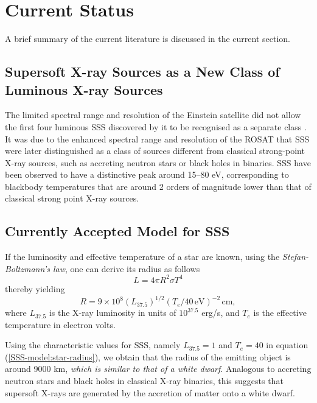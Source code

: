     \section{Current Status} \label{introduction:current_status}
        A brief summary of the current literature is discussed in the current section.
        
        \subsection{Supersoft X-ray Sources as a New Class of Luminous X-ray Sources} \label{introduction:current_status:new-class}
        	The limited spectral range and resolution of the Einstein satellite did not allow the first four luminous SSS discovered by it to be recognised as a separate class \cite{long81,seward81}. It was due to the enhanced spectral range and resolution of the ROSAT that SSS were later distinguished as a class of sources different from classical strong-point X-ray sources, such as accreting neutron stars or black holes in binaries. SSS have been observed to have a distinctive peak around 15--80 eV, corresponding to blackbody temperatures that are around 2 orders of magnitude lower than that of classical strong point X-ray sources.
        	
        \subsection{Currently Accepted Model for SSS} \label{introduction:current_status:SSS-model}
        	If the luminosity and effective temperature of a star are known, using the \emph{Stefan-Boltzmann's law}, one can derive its radius as follows
        	\begin{equation} \label{SSS-model:stef-boltz}
        		L=4\pi R^2\sigma T^4
        	\end{equation}
        	thereby yielding
        	\begin{equation} \label{SSS-model:star-radius}
        		R=9\times 10^8(L_{37.5})^{1/2}(T_e/40\,\mathrm{eV})^{-2}\,\mathrm{cm,}
        	\end{equation}
        	where $L_{37.5}$ is the X-ray luminosity in units of $10^{37.5}$ erg/s, and $T_e$ is the effective temperature in electron volts.
        	
        	Using the characteristic values for SSS, namely $L_{37.5}=1$ and $T_e=40$ in equation (\ref{SSS-model:star-radius}), we obtain that the radius of the emitting object is around 9000 km, \emph{which is similar to that of a white dwarf}. Analogous to accreting neutron stars and black holes in classical X-ray binaries, this suggests that supersoft X-rays are generated by the accretion of matter onto a white dwarf.
        	
